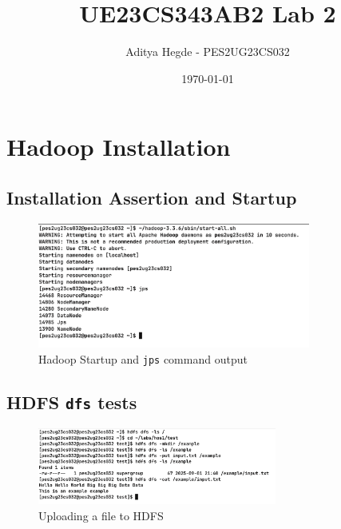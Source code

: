 \documentclass[12pt,a4paper]{article}
\title{UE23CS343AB2 Lab 2}
\author{Aditya Hegde \@- PES2UG23CS032}
\date{\today}
\begin{document}
\maketitle

\section{Hadoop Installation}
\subsection{Installation Assertion and Startup}

\begin{figure}[H]
   \centering
   \includegraphics[width=0.8\textwidth]{./images/img1.png} 
   \caption{Hadoop Startup and \texttt{jps} command output}
\end{figure}

\subsection{HDFS \texttt{dfs} tests}
\begin{figure}[H]
    \centering
    \includegraphics[width=0.7\textwidth]{./images/img2.png}
    \caption{Uploading a file to HDFS}
\end{figure}
\end{document}
